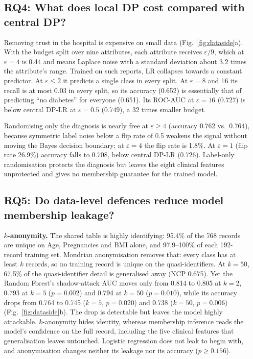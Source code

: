 \documentclass[conference]{IEEEtran}
\newcommand{\eps}{\varepsilon}
\begin{document}
\subsection{RQ4: What does local DP cost compared with central DP?}
Removing trust in the hospital is expensive on small data (Fig.~\ref{fig:dataside}a). With the budget split over nine attributes, each attribute receives $\eps/9$, which at $\eps{=}4$ is 0.44 and means Laplace noise with a standard deviation about 3.2 times the attribute's range. Trained on such reports, LR collapses towards a constant predictor. At $\eps\leq2$ it predicts a single class in every split. At $\eps{=}8$ and 16 its recall is at most 0.03 in every split, so its accuracy (0.652) is essentially that of predicting ``no diabetes'' for everyone (0.651). Its ROC-AUC at $\eps{=}16$ (0.727) is below central DP-LR at $\eps{=}0.5$ (0.749), a 32 times smaller budget.

Randomising only the diagnosis is nearly free at $\eps\geq4$ (accuracy 0.762 vs.\ 0.764), because symmetric label noise below a flip rate of 0.5 weakens the signal without moving the Bayes decision boundary; at $\eps{=}4$ the flip rate is 1.8\%. At $\eps{=}1$ (flip rate 26.9\%) accuracy falls to 0.708, below central DP-LR (0.726). Label-only randomisation protects the diagnosis but leaves the eight clinical features unprotected and gives no membership guarantee for the trained model.

\subsection{RQ5: Do data-level defences reduce model membership leakage?}
\textbf{$k$-anonymity.} The shared table is highly identifying: 95.4\% of the 768 records are unique on Age, Pregnancies and BMI alone, and 97.9--100\% of each 192-record training set. Mondrian anonymisation removes that: every class has at least $k$ records, so no training record is unique on the quasi-identifiers. At $k{=}50$, 67.5\% of the quasi-identifier detail is generalised away (NCP 0.675). Yet the Random Forest's shadow-attack AUC moves only from 0.814 to 0.805 at $k{=}2$, 0.793 at $k{=}5$ ($p{=}0.002$) and 0.794 at $k{=}50$ ($p{=}0.010$), while its accuracy drops from 0.764 to 0.745 ($k{=}5$, $p{=}0.020$) and 0.738 ($k{=}50$, $p{=}0.006$) (Fig.~\ref{fig:dataside}b). The drop is detectable but leaves the model highly attackable. $k$-anonymity hides identity, whereas membership inference reads the model's confidence on the full record, including the five clinical features that generalisation leaves untouched. Logistic regression does not leak to begin with, and anonymisation changes neither its leakage nor its accuracy ($p\geq0.156$).
\end{document}
